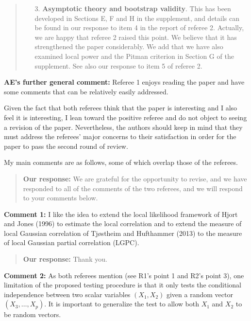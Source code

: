 \documentclass[
  12pt,
  letterpaper]{article}
\numberwithin{equation}{section}
\begin{document}
\begin{quote}
\begin{itemize}
\item [3.] \textbf{Asymptotic theory and bootstrap validity}. 
This has been developed in Sections E, F and H in the supplement, and details can be found in our response to item 4 in the report of referee 2. Actually, we are happy that referee 2 raised this point. We believe that it has strengthened the paper considerably. We add that we have also examined local power and the Pitman criterion in Section  G of the supplement. See also our response to item 5 of referee 2.
\end{itemize}
\end{quote}

\textbf{AE's further general comment:} Referee 1 enjoys reading the paper and have some comments that can be relatively easily addressed.

Given the fact that both referees think that the paper is interesting and I also feel it is interesting, I lean toward the positive referee and do not object to seeing a revision of the paper. Nevertheless, the authors should keep in mind that they must address the referees' major concerns to their satisfaction in order for the paper to pass the second round of review.

My main comments are as follows, some of which overlap those of the referees.

\begin{quote}
\textbf{Our response:} We are grateful for the opportunity to revise, and we have responded to all of the comments of the two referees, and we will respond to your comments below.
\end{quote}

\textbf{Comment 1:} I like the idea to extend the local likelihood framework of Hjort and Jones (1996) to estimate the local correlation and to extend the measure of local Gaussian correlation of Tjøstheim and Hufthammer (2013) to the measure of local Gaussian partial correlation (LGPC).

\begin{quote}
\textbf{Our response:} Thank you.
\end{quote}

\textbf{Comment 2:} As both referees mention (see R1's point 1 and R2's point 3), one limitation of the proposed testing procedure is that it only tests the conditional independence between two scalar variables \((X_1,X_2)\) given a random vector \((X_3,\ldots,X_p)\). It is important to generalize the test to allow
both \(X_1\) and \(X_2\) to be random vectors.
\end{document}
